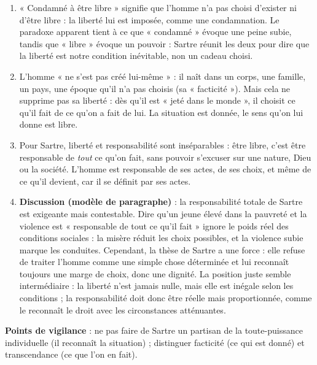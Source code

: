 \documentclass[11pt]{article}
\begin{document}
\begin{corrige}
\begin{enumerate}
\item « Condamné à être libre » signifie que l'homme n'a pas choisi d'exister ni d'être libre : la liberté lui est imposée, comme une condamnation. Le paradoxe apparent tient à ce que « condamné » évoque une peine subie, tandis que « libre » évoque un pouvoir : Sartre réunit les deux pour dire que la liberté est notre condition inévitable, non un cadeau choisi.
\item L'homme « ne s'est pas créé lui-même » : il naît dans un corps, une famille, un pays, une époque qu'il n'a pas choisis (sa « facticité »). Mais cela ne supprime pas sa liberté : dès qu'il est « jeté dans le monde », il choisit ce qu'il fait de ce qu'on a fait de lui. La situation est donnée, le sens qu'on lui donne est libre.
\item Pour Sartre, liberté et responsabilité sont inséparables : être libre, c'est être responsable de \emph{tout} ce qu'on fait, sans pouvoir s'excuser sur une nature, Dieu ou la société. L'homme est responsable de ses actes, de ses choix, et même de ce qu'il devient, car il se définit par ses actes.
\item \textbf{Discussion (modèle de paragraphe)} : la responsabilité totale de Sartre est exigeante mais contestable. Dire qu'un jeune élevé dans la pauvreté et la violence est « responsable de tout ce qu'il fait » ignore le poids réel des conditions sociales : la misère réduit les choix possibles, et la violence subie marque les conduites. Cependant, la thèse de Sartre a une force : elle refuse de traiter l'homme comme une simple chose déterminée et lui reconnaît toujours une marge de choix, donc une dignité. La position juste semble intermédiaire : la liberté n'est jamais nulle, mais elle est inégale selon les conditions ; la responsabilité doit donc être réelle mais proportionnée, comme le reconnaît le droit avec les circonstances atténuantes.
\end{enumerate}
\textbf{Points de vigilance} : ne pas faire de Sartre un partisan de la toute-puissance individuelle (il reconnaît la situation) ; distinguer facticité (ce qui est donné) et transcendance (ce que l'on en fait).
\end{corrige}
\end{document}
